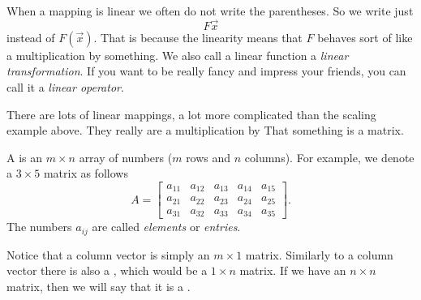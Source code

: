 When a mapping is linear we often do not write the parentheses.  So we write
just
\begin{equation*}
F \vec{x}
\end{equation*}
instead of $F(\vec{x})$.  That is because the linearity means that $F$
behaves sort of like a multiplication by something.
We also call a linear function a
\emph{linear transformation}.
If you want to be really fancy and impress your friends, you can call it a
\emph{linear operator}.

There are lots of linear mappings, a lot more complicated than the scaling
example above.  They really are a multiplication by 
That something is a matrix.

A \emph{}
is an $m
\times n$ array of numbers ($m$ rows and $n$ columns).  For example, we denote
a $3 \times 5$ matrix as follows
\begin{equation*}
A = 
\begin{bmatrix}
a_{11} & a_{12} & a_{13} & a_{14} & a_{15} \\
a_{21} & a_{22} & a_{23} & a_{24} & a_{25} \\
a_{31} & a_{32} & a_{33} & a_{34} & a_{35}
\end{bmatrix} .
\end{equation*}
The numbers $a_{ij}$ are called \emph{elements}
or \emph{entries}.

Notice that a column vector is simply an $m \times 1$ matrix.  Similarly to
a column vector there is also a 
\emph{}, which would be a $1 \times n$ matrix.
If we have an $n \times n$ matrix, then we will say that it is a
\emph{}.

